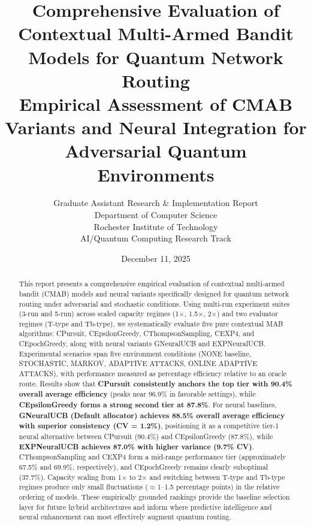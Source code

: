 \documentclass[12pt,a4paper]{article}
\title{\textbf{Comprehensive Evaluation of Contextual Multi-Armed Bandit Models for Quantum Network Routing}\\
\large{Empirical Assessment of CMAB Variants and Neural Integration for Adversarial Quantum Environments}}
\author{Graduate Assistant Research \& Implementation Report\\ 
Department of Computer Science \\ 
Rochester Institute of Technology \\ 
AI/Quantum Computing Research Track}
\date{December 11, 2025}
\newcommand{\performance}[1]{\textcolor{performancecolor}{\textbf{#1}}}
\newcommand{\legacy}[1]{\textcolor{legacycolor}{\textbf{#1}}}
\newcommand{\neural}[1]{\textcolor{neuralcolor}{\textbf{#1}}}
\begin{document}
\maketitle

\begin{abstract}
This report presents a comprehensive empirical evaluation of contextual multi-armed bandit (CMAB) models and neural variants specifically designed for quantum network routing under adversarial and stochastic conditions. Using multi-run experiment suites (3-run and 5-run) across scaled capacity regimes (1$\times$, 1.5$\times$, 2$\times$) and two evaluator regimes (T-type and Tb-type), we systematically evaluate five pure contextual MAB algorithms: CPursuit, CEpsilonGreedy, CThompsonSampling, CEXP4, and CEpochGreedy, along with neural variants GNeuralUCB and EXPNeuralUCB. Experimental scenarios span five environment conditions (NONE baseline, STOCHASTIC, MARKOV, ADAPTIVE ATTACKS, ONLINE ADAPTIVE ATTACKS), with performance measured as percentage efficiency relative to an oracle route. Results show that \performance{CPursuit consistently anchors the top tier with 90.4\% overall average efficiency} (peaks near 96.9\% in favorable settings), while \performance{CEpsilonGreedy forms a strong second tier at 87.8\%}. For neural baselines, \neural{GNeuralUCB (Default allocator) achieves 88.5\% overall average efficiency with superior consistency (CV = 1.2\%)}, positioning it as a competitive tier-1 neural alternative between CPursuit (90.4\%) and CEpsilonGreedy (87.8\%), while \legacy{EXPNeuralUCB achieves 87.0\% with higher variance (9.7\% CV)}. CThompsonSampling and CEXP4 form a mid-range performance tier (approximately 67.5\% and 69.9\%, respectively), and CEpochGreedy remains clearly suboptimal (37.7\%). Capacity scaling from 1$\times$ to 2$\times$ and switching between T-type and Tb-type regimes produce only small fluctuations ($\approx$1--1.5 percentage points) in the relative ordering of models. These empirically grounded rankings provide the baseline selection layer for future hybrid architectures and inform where predictive intelligence and neural enhancement can most effectively augment quantum routing.
\end{abstract}

\newpage
{\tableofcontents}

\newpage
\end{document}
